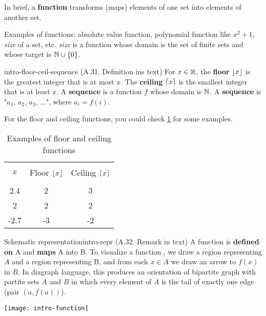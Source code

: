 \documentclass[../src/handouts/main.tex]{subfiles}
\begin{document}
In brief, a \textbf{function} transforms (maps) elements of one set into elements of another set.

Examples of functions: absolute value function, polynomial function like $x^2 + 1$, \textit{size} of a set, etc. \textit{size} is a function whose domain is the set of finite sets and whose target is $\mathbb{N} \cup \{0\}$.

\begin{definition}{}{intro-floor-ceil-sequence}
  (A.31. Definition ins text)
  For $x \in \mathbb{R}$, the \textbf{floor} $\lfloor x\rfloor$ is the greatest integer that is at most $x$.
  The \textbf{ceiling} $\lceil x\rceil$ is the smallest integer that is at least $x$.
  A \textbf{sequence} is a function $f$ whose domain is $\mathbb{N}$.
  A \textbf{sequence} is "$a_1,\, a_2,\, a_3,\, \ldots$", where $a_i = f(i)$.
\end{definition}

For the floor and ceiling functions, you could check \cref{table:intro-ex-floor-ceil} for some examples.

\begin{table}[htbp]
  \def \gap {\\[-0.5em]}
  \centering
  \begin{tabular}{ccc}
    \hline \gap
    $x$  & Floor $\lfloor x\rfloor$ & Ceiling $\lceil x\rceil$ \gap \\ \hline
    2.4  & 2                 & 3                       \\
    2    & 2                 & 2                       \\
    -2.7 & -3                & -2                      \\ \hline
  \end{tabular}
  \caption{Examples of floor and ceiling functions}
  \label{table:intro-ex-floor-ceil}
\end{table}

\begin{remark}{Schematic representation}{intro-repr}
  (A.32. Remark in text)
  A function  is \textbf{defined on} A and \textbf{maps} A into B.
  To visualize a function , we draw a region representing $A$ and a region representing B, and from each $x \in A$ we draw an arrow to $f(x)$ in $B$.
  In diagraph language, this produces an orientation of bipartite graph with partite sets $A$ and $B$ in which every element of $A$ is the tail of exactly one edge (pair $(a, f(a))$).

  \centering
  \texttt{[image: intro-function]}
\end{remark}
\end{document}
